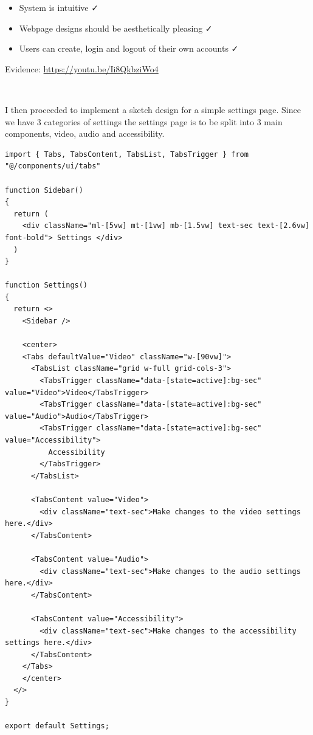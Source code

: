 \begin{itemize}
  \item System is intuitive \faCheck \\
  \item Webpage designs should be aesthetically pleasing \faCheck \\
  \item Users can create, login and logout of their own accounts \faCheck \\
\end{itemize}

{\sffamily Evidence:} \url{https://youtu.be/Ii8QkbziWo4} \\ \vspace{0.2cm}

{\color{gray} \hrulefill} \\ \vspace{0.2cm}

I then proceeded to implement a sketch design for a simple settings
page. Since we have 3 categories of settings the settings page
is to be split into 3 main components, video, audio and
accessibility.

\begin{verbatim}
import { Tabs, TabsContent, TabsList, TabsTrigger } from "@/components/ui/tabs"

function Sidebar()
{
  return (
    <div className="ml-[5vw] mt-[1vw] mb-[1.5vw] text-sec text-[2.6vw] font-bold"> Settings </div>
  )
}

function Settings()
{
  return <>
    <Sidebar />

    <center>
    <Tabs defaultValue="Video" className="w-[90vw]">
      <TabsList className="grid w-full grid-cols-3">
        <TabsTrigger className="data-[state=active]:bg-sec" value="Video">Video</TabsTrigger>
        <TabsTrigger className="data-[state=active]:bg-sec" value="Audio">Audio</TabsTrigger>
        <TabsTrigger className="data-[state=active]:bg-sec" value="Accessibility">
          Accessibility
        </TabsTrigger>
      </TabsList>

      <TabsContent value="Video">
        <div className="text-sec">Make changes to the video settings here.</div>
      </TabsContent>

      <TabsContent value="Audio">
        <div className="text-sec">Make changes to the audio settings here.</div>
      </TabsContent>

      <TabsContent value="Accessibility">
        <div className="text-sec">Make changes to the accessibility settings here.</div>
      </TabsContent>
    </Tabs>
    </center>
  </>
}

export default Settings;
\end{verbatim}

